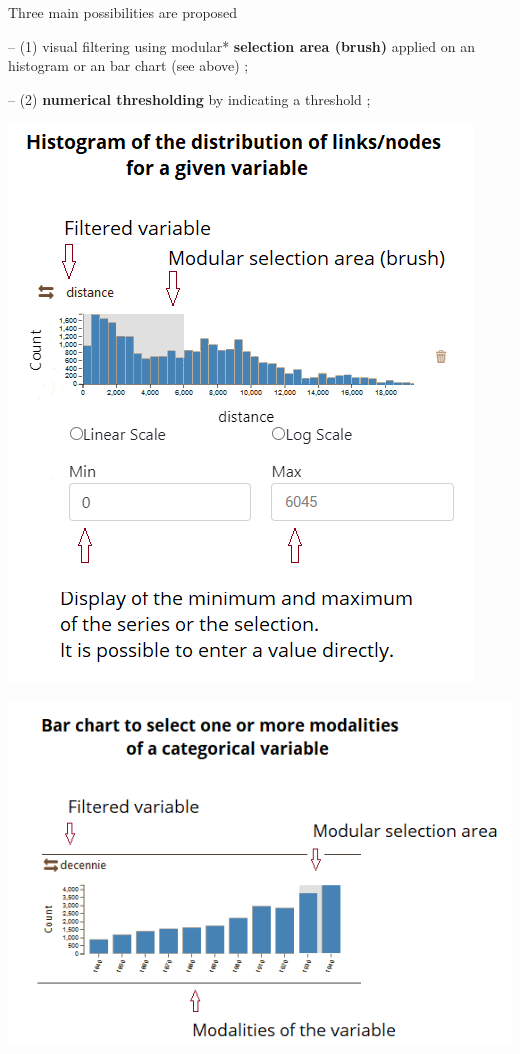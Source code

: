 \documentclass[
  letterpaper,
  DIV=11,
  numbers=noendperiod]{scrreprt}
\begin{document}
Three main possibilities are proposed

-- (1) visual filtering using modular* \textbf{selection area (brush)}
applied on an histogram or an bar chart (see above) ;

-- (2) \textbf{numerical thresholding} by indicating a threshold ;

\includegraphics{images/schema_histogram.png}

\includegraphics{images/schema_BarChart.png}
\end{document}
